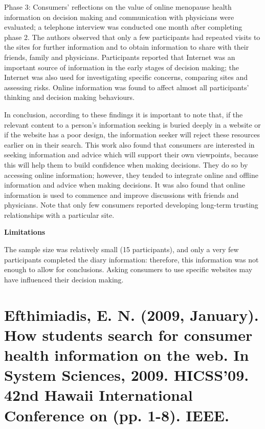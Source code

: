 \documentclass[]{article}
\begin{document}
Phase 3: Consumers' reflections on the value of online menopause health information on decision making and communication with physicians were evaluated; a telephone interview was conducted one month after completing phase 2. The authors observed that only a few  participants had repeated visits to the sites for further information and to obtain information to share with their friends, family and physicians. Participants reported that Internet was an important source of information in the early stages of decision making; the Internet was also used for investigating specific concerns, comparing sites and assessing risks. Online information was found to affect almost all participants' thinking and decision making behaviours.                     

In conclusion, according to these findings it is important to note that, if the relevant content to a person's information seeking is buried deeply in a website or if the website has a poor design, the information seeker will reject these resources earlier on in their search. This work also found that consumers are interested in seeking information and advice which will support their own viewpoints, because this will help them to build confidence when making decisions. They do so by accessing online information; however, they tended to integrate online and offline information and advice when making decisions. It was also found that online information is used to commence and improve discussions with friends and physicians. Note that only few consumers reported developing long-term trusting relationships with a particular site.     

\textbf{Limitations}

The sample size was relatively small (15 participants), and only a very few participants completed the diary information: therefore, this information was not enough to allow for conclusions.  Asking consumers to use specific websites may have influenced their decision making.


\section{Efthimiadis, E. N. (2009, January). How students search for consumer health information on the web. In System Sciences, 2009. HICSS'09. 42nd Hawaii International Conference on (pp. 1-8). IEEE.}
\end{document}
